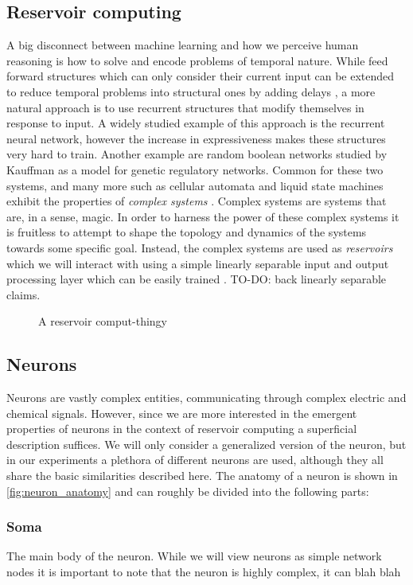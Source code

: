 \subsection{Reservoir computing}
A big disconnect between machine learning and how we perceive human reasoning is
how to solve and encode problems of temporal nature.
While feed forward structures which can only consider their current input can be
extended to reduce temporal problems into structural ones by adding delays
\cite{schrauwen_overview_2007}, a more natural approach is to use
recurrent structures that modify themselves in response to input.
A widely studied example of this approach is the recurrent neural network,
however the increase in expressiveness makes these structures very hard to
train\cite{bertschinger_real-time_2004}.
Another example are random boolean networks \cite{gershenson_introduction_2004}
studied by Kauffman as a  model for genetic regulatory networks.
Common for these two systems, and many more such as cellular
automata \cite{sipper_emergence_1999} and liquid state machines exhibit the
properties of \textit{complex systems} \cite{langton_computation_1990}.
Complex systems are systems that are, in a sense, magic.
In order to harness the power of these complex systems it is fruitless to
attempt to shape the topology and dynamics of the systems towards some specific
goal. Instead, the complex systems are used as \textit{reservoirs} which we will
interact with using a simple linearly separable input and output processing
layer which can be easily trained \cite{schrauwen_overview_2007}.
TO-DO: back linearly separable claims.
\begin{figure}[h]
  
  \caption{A reservoir comput-thingy}
  \label{fig:RC}
\end{figure}
\subsection{Neurons}
Neurons are vastly complex entities, communicating through complex electric
and chemical signals. However, since we are more interested in the emergent
properties of neurons in the context of reservoir computing a superficial
description suffices.
We will only consider a generalized version of the neuron, but in our
experiments a plethora of different neurons are used, although they
all share the basic similarities described here.
The anatomy of a neuron is shown in \ref{fig:neuron_anatomy} and can roughly be
divided into the following parts:
\subsubsection{Soma}
The main body of the neuron. While we will view neurons as simple network nodes
it is important to note that the neuron is highly complex, it can blah blah

